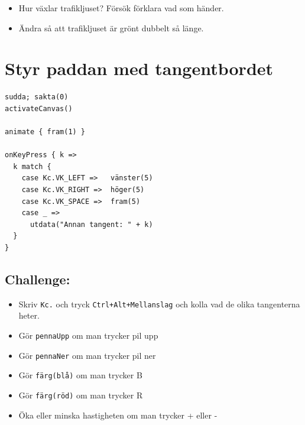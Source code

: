 \begin{itemize}

\item {Hur växlar trafikljuset? Försök förklara vad som händer.}
\item {Ändra så att trafikljuset är grönt dubbelt så länge.}

\end{itemize}


\chapter{Styr paddan med tangentbordet}
\begin{multicols}{2}

\begin{lstlisting}[basicstyle={\ttfamily\fontsize{18}{22}\selectfont},numbers=none]
sudda; sakta(0)
activateCanvas()

animate { fram(1) }

onKeyPress { k =>
  k match {
    case Kc.VK_LEFT =>   vänster(5)
    case Kc.VK_RIGHT =>  höger(5)
    case Kc.VK_SPACE =>  fram(5)
    case _ => 
      utdata("Annan tangent: " + k)
  }
}
\end{lstlisting}
        


\columnbreak


\section*{\color{BrickRed}Challenge:}


\begin{itemize}

\item {Skriv \lstinline{Kc.} och tryck \lstinline{Ctrl+Alt+Mellanslag} och kolla vad de olika tangenterna heter.}
\item {Gör \lstinline{pennaUpp} om man trycker pil upp}
\item {Gör \lstinline{pennaNer} om man trycker pil ner}
\item {Gör \lstinline{färg(blå)} om man trycker B}
\item {Gör \lstinline{färg(röd)} om man trycker R}
\item {Öka eller minska hastigheten om man trycker + eller -}

\end{itemize}


\end{multicols}

